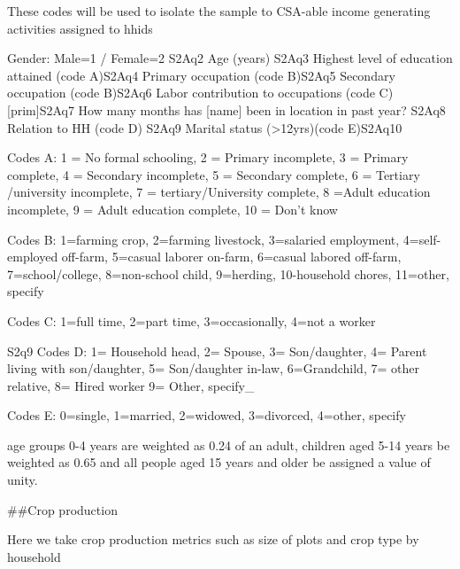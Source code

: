 \documentclass[
]{article}
\begin{document}
These codes will be used to isolate the sample to CSA-able income
generating activities assigned to hhids

Gender: Male=1 / Female=2 S2Aq2 Age (years) S2Aq3 Highest level of
education attained (code A)S2Aq4 Primary occupation (code B)S2Aq5
Secondary occupation (code B)S2Aq6 Labor contribution to occupations
(code C){[}prim{]}S2Aq7 How many months has {[}name{]} been in location
in past year? S2Aq8 Relation to HH (code D) S2Aq9 Marital status
(\textgreater12yrs)(code E)S2Aq10

Codes A: 1 = No formal schooling, 2 = Primary incomplete, 3 = Primary
complete, 4 = Secondary incomplete, 5 = Secondary complete, 6 = Tertiary
/university incomplete, 7 = tertiary/University complete, 8 =Adult
education incomplete, 9 = Adult education complete, 10 = Don't know

Codes B: 1=farming crop, 2=farming livestock, 3=salaried employment,
4=self-employed off-farm, 5=casual laborer on-farm, 6=casual labored
off-farm, 7=school/college, 8=non-school child, 9=herding, 10-household
chores, 11=other, specify

Codes C: 1=full time, 2=part time, 3=occasionally, 4=not a worker

S2q9 Codes D: 1= Household head, 2= Spouse, 3= Son/daughter, 4= Parent
living with son/daughter, 5= Son/daughter in-law, 6=Grandchild, 7= other
relative, 8= Hired worker 9= Other, specify\_

Codes E: 0=single, 1=married, 2=widowed, 3=divorced, 4=other, specify

age groups 0-4 years are weighted as 0.24 of an adult, children aged
5-14 years be weighted as 0.65 and all people aged 15 years and older be
assigned a value of unity.

\#\#Crop production

Here we take crop production metrics such as size of plots and crop type
by household
\end{document}
